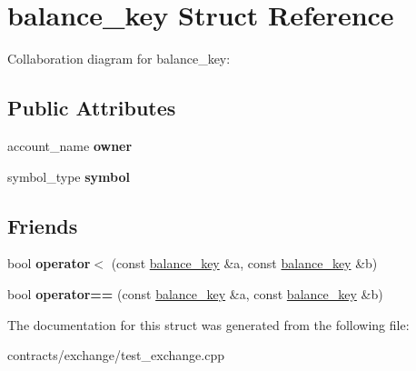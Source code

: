 \hypertarget{structbalance__key}{}\section{balance\+\_\+key Struct Reference}
\label{structbalance__key}


Collaboration diagram for balance\+\_\+key\+:
\subsection*{Public Attributes}
\begin{DoxyCompactItemize}
\item 
\mbox{\label{structbalance__key_a6cded65c993265817f482c8f79cb8686}} 
account\+\_\+name {\bfseries owner}
\item 
\mbox{\label{structbalance__key_af4019e538c77b0d8b2cd82fe74926749}} 
symbol\+\_\+type {\bfseries symbol}
\end{DoxyCompactItemize}
\subsection*{Friends}
\begin{DoxyCompactItemize}
\item 
\mbox{\label{structbalance__key_a1b5bc0d806320564d878176180e546ff}} 
bool {\bfseries operator$<$} (const \mbox{\hyperlink{structbalance__key}{balance\+\_\+key}} \&a, const \mbox{\hyperlink{structbalance__key}{balance\+\_\+key}} \&b)
\item 
\mbox{\label{structbalance__key_af9c1c34d79a4de8dc77abcd89c33e5c5}} 
bool {\bfseries operator==} (const \mbox{\hyperlink{structbalance__key}{balance\+\_\+key}} \&a, const \mbox{\hyperlink{structbalance__key}{balance\+\_\+key}} \&b)
\end{DoxyCompactItemize}


The documentation for this struct was generated from the following file\+:\begin{DoxyCompactItemize}
\item 
contracts/exchange/test\+\_\+exchange.\+cpp\end{DoxyCompactItemize}
